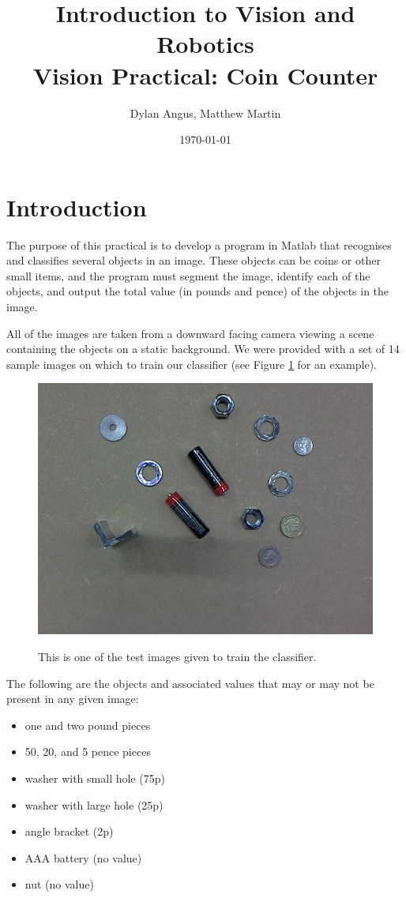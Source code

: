 \documentclass[12pt]{article}
\title{Introduction to Vision and Robotics\\Vision Practical: Coin Counter}
\author{Dylan Angus, Matthew Martin}
\date{\today}
\begin{document}
	
\maketitle

\section{Introduction}

The purpose of this practical is to develop a program in Matlab that recognises and classifies several objects in an image. These objects can be coins or other small items, and the program must segment the image, identify each of the objects, and output the total value (in pounds and pence) of the objects in the image.

All of the images are taken from a downward facing camera viewing a scene containing the objects on a static background. We were provided with a set of 14 sample images on which to train our classifier (see Figure \ref{samplescene} for an example).

\begin{figure}
	\centering
	\includegraphics[width=0.75\linewidth]{02}
	\label{samplescene}
	\caption{This is one of the test images given to train the classifier.}
\end{figure}

The following are the objects and associated values that may or may not be present in any given image:
\begin{itemize}
	\item one and two pound pieces
	\item 50, 20, and 5 pence pieces
	\item washer with small hole (75p)
	\item washer with large hole (25p)
	\item angle bracket (2p)
	\item AAA battery (no value)
	\item nut (no value)
\end{itemize}
\end{document}
